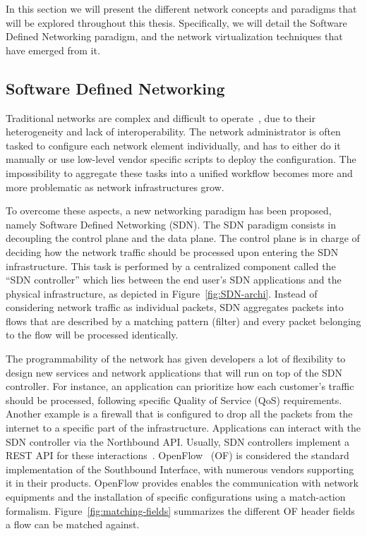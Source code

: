 In this section we will present the different network concepts and paradigms that will be explored throughout this thesis.
Specifically, we will detail the Software Defined Networking paradigm, and the network virtualization techniques that have emerged from it.

\subsection{Software Defined Networking}

Traditional networks are complex and difficult to operate~\cite{complexnetworks}, due to their heterogeneity and lack of interoperability. The network administrator is often tasked to configure each network element individually, and has to either do it manually or use low-level vendor specific scripts to deploy the configuration. The impossibility to aggregate these tasks into a unified workflow becomes more and more problematic as network infrastructures grow.

To overcome these aspects, a new networking paradigm has been proposed, namely Software Defined Networking (SDN).
The SDN paradigm consists in decoupling the control plane and the data plane.
The control plane is in charge of deciding how the network traffic should be processed upon entering the SDN infrastructure.
This task is performed by a centralized component called the ``SDN controller'' which lies between the end user's SDN applications and the physical infrastructure, as depicted in Figure~\ref{fig:SDN-archi}. Instead of considering network traffic as individual packets, SDN aggregates packets into flows that are described by a matching pattern (filter) and every packet belonging to the flow will be processed identically. 



The programmability of the network has given developers a lot of flexibility to design new services and network applications that will run on top of the SDN controller.
For instance, an application can prioritize how each customer's traffic should be processed, following specific Quality of Service (QoS) requirements.
Another example is a firewall that is configured to drop all the packets from the internet to a specific part of the infrastructure.
Applications can interact with the SDN controller via the Northbound API.
Usually, SDN controllers implement a REST API for these interactions~\cite{onos-Berde2014a,opendaylight,floodlight}.
OpenFlow~\cite{Openflow-McKeown2008} (OF) is considered the standard implementation of the Southbound Interface, with numerous vendors supporting it in their products.
OpenFlow provides enables the communication with network equipments and the installation of specific configurations using a match-action formalism.
Figure~\ref{fig:matching-fields} summarizes the different OF header fields a flow can be matched against.


